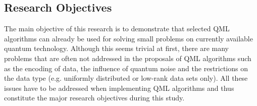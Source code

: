 \documentclass[a4paper]{article}
\newcommand*{\0}{$\ket{0}$}
\newcommand*{\1}{$\ket{1}$}
\begin{document}
\subsection{Research Objectives}
\label{subsec:researchobjectives}

The main objective of this research is to demonstrate that selected QML algorithms can already be used for solving small problems on currently available quantum technology. Although this seems trivial at first, there are many problems that are often not addressed in the proposals of QML algorithms such as the encoding of data, the influence of quantum noise and the restrictions on the data type (e.g. uniformly distributed or low-rank data sets only). All these issues have to be addressed when implementing QML algorithms and thus constitute the major research objectives during this study. 



\end{document}
